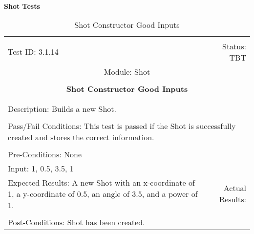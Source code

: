 \documentclass[titlepage]{article}
\begin{document}
\large{\textbf{Shot Tests}}
\begin{center}%
\begin{table}
\begin{tabular}{|l r|}\hline&\\[-2mm]
	Test ID: 3.1.14	&Status: TBT\\[-3mm]
	\multicolumn{2}{|c|}{Module: Shot}\\&\\
	\multicolumn{2}{|c|}{\textbf{\large{Shot Constructor Good Inputs}}}\\&\\\hline&\\[-3mm]
	\multicolumn{2}{|p{\textwidth}|}{Description: Builds a new Shot.}\\[1mm]\hline&\\[-3mm]
	\multicolumn{2}{|p{\textwidth}|}{Pass/Fail Conditions: This test is passed if the Shot is successfully created and stores the correct information.}\\[1mm]\hline&\\[-3mm]
	\multicolumn{2}{|p{\textwidth}|}{Pre-Conditions: None}\\[4mm]
	\multicolumn{2}{|p{\textwidth}|}{Input: 1, 0.5, 3.5, 1}\\[2mm]\hline
	\multicolumn{1}{|p{0.49\textwidth}}{Expected Results: A new Shot with an x-coordinate of 1, a y-coordinate of 0.5, an angle of 3.5, and a power of 1.}	&\multicolumn{1}{|p{0.45\textwidth}|}{Actual Results: }\\\hline&\\[-3mm]
	\multicolumn{2}{|p{\textwidth}|}{Post-Conditions: Shot has been created.}\\\hline
\end{tabular}
\caption{Shot Constructor Good Inputs}
\end{table}
\end{center}
\end{document}
